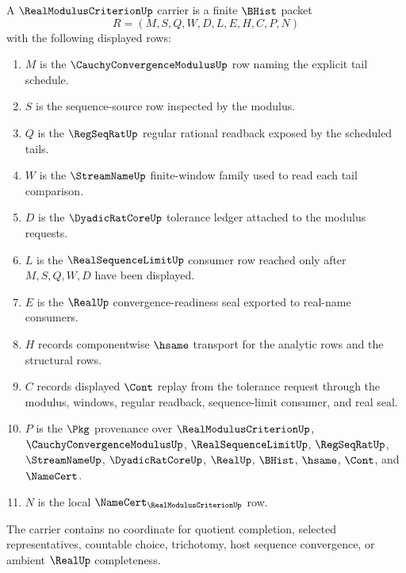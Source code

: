 \begin{definition}
\label{def:real-modulus-criterion-carrier}
A $\RealModulusCriterionUp$ carrier is a finite $\BHist$ packet
$$
R=(M,S,Q,W,D,L,E,H,C,P,N)
$$
with the following displayed rows:
\begin{enumerate}
\item $M$ is the $\CauchyConvergenceModulusUp$ row naming the explicit tail schedule.
\item $S$ is the sequence-source row inspected by the modulus.
\item $Q$ is the $\RegSeqRatUp$ regular rational readback exposed by the scheduled tails.
\item $W$ is the $\StreamNameUp$ finite-window family used to read each tail comparison.
\item $D$ is the $\DyadicRatCoreUp$ tolerance ledger attached to the modulus requests.
\item $L$ is the $\RealSequenceLimitUp$ consumer row reached only after $M,S,Q,W,D$ have been displayed.
\item $E$ is the $\RealUp$ convergence-readiness seal exported to real-name consumers.
\item $H$ records componentwise $\hsame$ transport for the analytic rows and the structural rows.
\item $C$ records displayed $\Cont$ replay from the tolerance request through the modulus, windows, regular readback, sequence-limit consumer, and real seal.
\item $P$ is the $\Pkg$ provenance over $\RealModulusCriterionUp$, $\CauchyConvergenceModulusUp$, $\RealSequenceLimitUp$, $\RegSeqRatUp$, $\StreamNameUp$, $\DyadicRatCoreUp$, $\RealUp$, $\BHist$, $\hsame$, $\Cont$, and $\NameCert$.
\item $N$ is the local $\NameCert_{\RealModulusCriterionUp}$ row.
\end{enumerate}
The carrier contains no coordinate for quotient completion, selected representatives, countable choice, trichotomy, host sequence convergence, or ambient $\RealUp$ completeness.
\end{definition}

